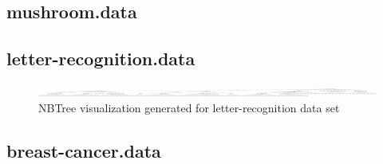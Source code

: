 \documentclass[10pt]{report}
\begin{document}
\subsection*{mushroom.data}


\subsection*{letter-recognition.data}
\begin{figure}
  \begin{center}
	\includegraphics[width=\textwidth,height=!]{letter-recognition}
  \end{center}
  \caption{NBTree visualization generated for letter-recognition data set}
  \label{fig:letter-recognition}
\end{figure} 

\subsection*{breast-cancer.data}






\end{document}

